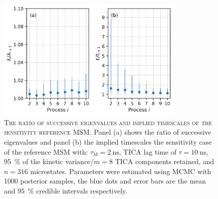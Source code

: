 \begin{figure}[ht!]
 \centering
 \includegraphics[width=0.8\textwidth]{chapters/aadh/figures/timescale_ratios_D_sens.png}
 \caption[The ratio of successive eigenvalues and implied timescales of the sensitivity reference MSM]{\textsc{The ratio of successive eigenvalues and implied timescales of the sensitivity reference MSM}. Panel (a) shows the ratio of successive eigenvalues and panel (b) the implied timescales the sensitivity case of the reference MSM with: $\tau_{\mathrm{M}}=\SI{2}{\nano\second}$, TICA lag time of $\tau=\SI{10}{\nano\second}$, \SI{95}{\percent} of the kinetic variance/$m=8$ TICA components retained, and $n=316$ microstates. Parameters were estimated using MCMC with \num{1000} posterior samples, the blue dots and error bars are the mean and \SI{95}{\percent} credible intervals respectively.}
 \label{fig:ts_ratios_d_sens}
\end{figure}


